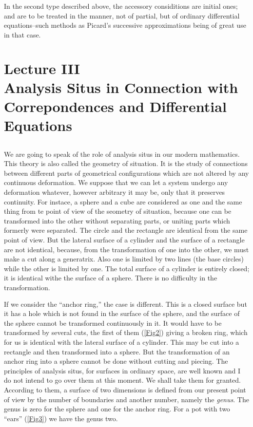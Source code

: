 \documentclass[12pt,oneside]{book}
\begin{document}
In the second type described above, the accessory considitions are initial ones; and are to be treated in the manner, not of partial, but of ordinary differential equations--such methods as Picard's successive approximations being of great use in that case. \par 

\chapter{Lecture III\\Analysis Situs in Connection with\\Correpondences and Differential Equations}
\section{}
We are going to speak of the role of analysis situs in our modern mathematics. This theory is also called the geometry of situation. It is the study of connections between different parts of geometrical configurations which are not altered by any continuous deformation. We suppose that we can let a system undergo any deformation whatever, however arbitrary it may be, only that it preserves continuity. For instace, a sphere and a cube are considered as one and the same thing from te point of view of the seometry of situation, because one can be transformed into the other without separating parts, or uniting parts which formerly were separated. The circle and the rectangle are identical from the same point of view. But the lateral surface of a cylinder and the surface of a rectangle are not identical, because, from the transformation of one into the other, we must make a cut along a generatrix. Also one is limited by two lines (the base circles) while the other is limited by one. The total surface of a cylinder is entirely closed; it is identical withe the surface of a sphere. There is no difficulty in the transformation. \par 

If we consider the ``anchor ring,'' the case is different. This is a closed surface but it has a hole which is not found in the surface of the sphere, and the surface of the sphere cannot be transformed continuously in it. It would have to be transformed by several cuts, the first of them (\ref{Fig2}) giving a broken ring, which for us is identical with the lateral surface of a cylinder. This may be cut into a rectangle and then transformed into a sphere. But the transformation of an anchor ring into a sphere cannot be done without cutting and piecing. The principles of analysis situs, for surfaces in ordinary space, are well known and I do not intend to go over them at this moment. We shall take them for granted. According to them, a surface of two dimensions is defined from our present point of view by the number of boundaries and another number, namely the \textit{genus}. The genus is zero for the sphere and one for the anchor ring. For a pot with two ``ears'' (\ref{Fig3}) we have the genus two. \par 
\end{document}
